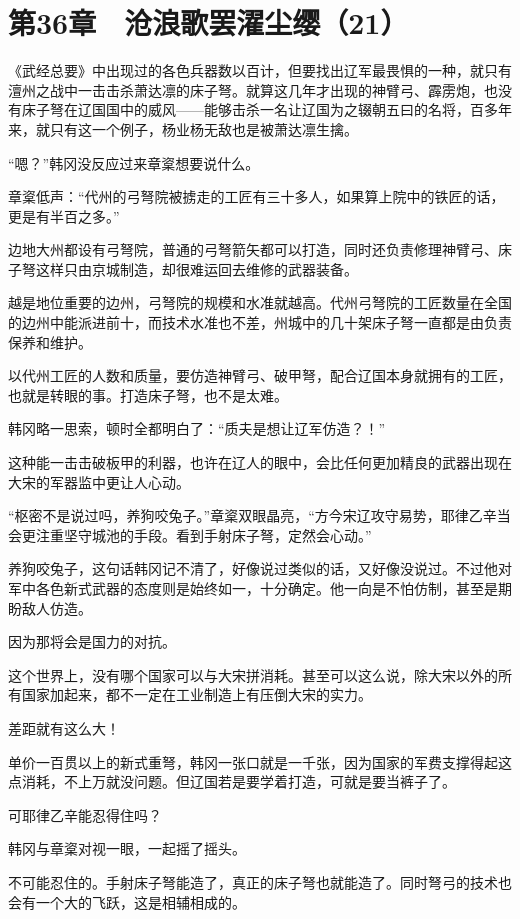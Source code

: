 \section{第36章　沧浪歌罢濯尘缨（21）}

《武经总要》中出现过的各色兵器数以百计，但要找出辽军最畏惧的一种，就只有澶州之战中一击击杀萧达凛的床子弩。就算这几年才出现的神臂弓、霹雳炮，也没有床子弩在辽国国中的威风——能够击杀一名让辽国为之辍朝五曰的名将，百多年来，就只有这一个例子，杨业杨无敌也是被萧达凛生擒。

“嗯？”韩冈没反应过来章楶想要说什么。

章楶低声：“代州的弓弩院被掳走的工匠有三十多人，如果算上院中的铁匠的话，更是有半百之多。”

边地大州都设有弓弩院，普通的弓弩箭矢都可以打造，同时还负责修理神臂弓、床子弩这样只由京城制造，却很难运回去维修的武器装备。

越是地位重要的边州，弓弩院的规模和水准就越高。代州弓弩院的工匠数量在全国的边州中能派进前十，而技术水准也不差，州城中的几十架床子弩一直都是由负责保养和维护。

以代州工匠的人数和质量，要仿造神臂弓、破甲弩，配合辽国本身就拥有的工匠，也就是转眼的事。打造床子弩，也不是太难。

韩冈略一思索，顿时全都明白了：“质夫是想让辽军仿造？！”

这种能一击击破板甲的利器，也许在辽人的眼中，会比任何更加精良的武器出现在大宋的军器监中更让人心动。

“枢密不是说过吗，养狗咬兔子。”章楶双眼晶亮，“方今宋辽攻守易势，耶律乙辛当会更注重坚守城池的手段。看到手射床子弩，定然会心动。”

养狗咬兔子，这句话韩冈记不清了，好像说过类似的话，又好像没说过。不过他对军中各色新式武器的态度则是始终如一，十分确定。他一向是不怕仿制，甚至是期盼敌人仿造。

因为那将会是国力的对抗。

这个世界上，没有哪个国家可以与大宋拼消耗。甚至可以这么说，除大宋以外的所有国家加起来，都不一定在工业制造上有压倒大宋的实力。

差距就有这么大！

单价一百贯以上的新式重弩，韩冈一张口就是一千张，因为国家的军费支撑得起这点消耗，不上万就没问题。但辽国若是要学着打造，可就是要当裤子了。

可耶律乙辛能忍得住吗？

韩冈与章楶对视一眼，一起摇了摇头。

不可能忍住的。手射床子弩能造了，真正的床子弩也就能造了。同时弩弓的技术也会有一个大的飞跃，这是相辅相成的。

